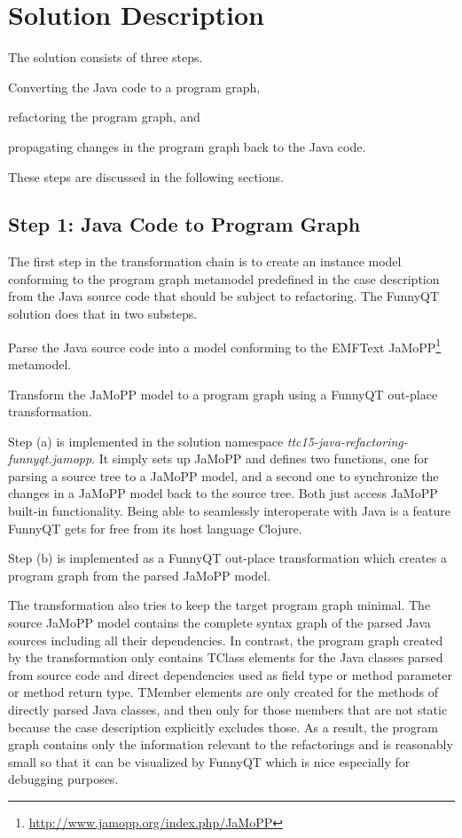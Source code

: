 \documentclass[submission]{eptcs}
\begin{document}
\section{Solution Description}
\label{sec:solution-description}

The solution consists of three steps.
\begin{inparaenum}[(1)]
\item Converting the Java code to a program graph,
\item refactoring the program graph, and
\item propagating changes in the program graph back to the Java code.
\end{inparaenum}
These steps are discussed in the following sections.

\subsection{Step 1: Java Code to Program Graph}
\label{sec:step-1:java-to-pg}

The first step in the transformation chain is to create an instance model
conforming to the program graph metamodel predefined in the case description
from the Java source code that should be subject to refactoring.  The FunnyQT
solution does that in two substeps.
\begin{compactenum}[(a)]
\item Parse the Java source code into a model conforming to the EMFText
  JaMoPP\footnote{\url{http://www.jamopp.org/index.php/JaMoPP}} metamodel.
\item Transform the JaMoPP model to a program graph using a FunnyQT out-place
  transformation.
\end{compactenum}
Step (a) is implemented in the solution namespace
\emph{ttc15-java-refactoring-funnyqt.jamopp}.  It simply sets up JaMoPP and
defines two functions, one for parsing a source tree to a JaMoPP model, and a
second one to synchronize the changes in a JaMoPP model back to the source
tree.  Both just access JaMoPP built-in functionality.  Being able to
seamlessly interoperate with Java is a feature FunnyQT gets for free from its
host language Clojure.

Step (b) is implemented as a FunnyQT out-place transformation which creates a
program graph from the parsed JaMoPP model.

The transformation also tries to keep the target program graph minimal.  The
source JaMoPP model contains the complete syntax graph of the parsed Java
sources including all their dependencies.  In contrast, the program graph
created by the transformation only contains \textsf{TClass} elements for the
Java classes parsed from source code and direct dependencies used as field type
or method parameter or method return type.  \textsf{TMember} elements are only
created for the methods of directly parsed Java classes, and then only for
those members that are not static because the case description explicitly
excludes those.  As a result, the program graph contains only the information
relevant to the refactorings and is reasonably small so that it can be
visualized by FunnyQT which is nice especially for debugging purposes.
\end{document}
